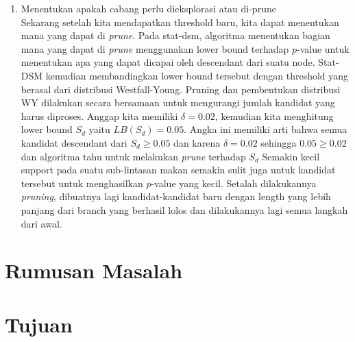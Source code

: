 \documentclass[a4paper,twoside]{article}
\begin{document}
\begin{enumerate}
	Sekarang dapat dengan $\alpha = 0.05$ dan $B = 252$ dapat dihitung sebagai \[ \alpha B = \lfloor 0.05(252) \rfloor = \lfloor 12.6 \rfloor = 12 \]
	Sehingga dari tabel list $p_{min}^x$ kami mengambil nilai ke-12 yaitu $\delta = 0.04762$ dan inilah yang akan menjadi threshold baru.
	Kita kemudian akan melihat lagi nilai-nilai $p$-value yang menggunakan data label original dan filter lagi menggunakan threshold yang baru.
	\item Menentukan apakah cabang perlu dieksplorasi atau di-prune \\
	Sekarang setelah kita mendapatkan threshold baru, kita dapat menentukan mana yang dapat di \textit{prune}.
	Pada stat-dsm, algoritma menentukan bagian mana yang dapat di \textit{prune} menggunakan lower bound terhadap $p$-value untuk menentukan apa yang dapat dicapai oleh descendant dari suatu node.
	Stat-DSM kemudian membandingkan lower bound tersebut dengan threshold yang berasal dari distribusi Westfall-Young.
	Pruning dan pembentukan distribusi WY dilakukan secara bersamaan untuk mengurangi jumlah kandidat yang harus diproses.
	Anggap kita memiliki $\delta = 0.02$, kemudian kita menghitung lower bound $S_d$ yaitu $LB(S_d) = 0.05$.
	Angka ini memiliki arti bahwa semua kandidat descendant dari $S_d \geq 0.05$ dan karena $\delta = 0.02$ sehingga $0.05 \geq 0.02$ dan algoritma tahu untuk melakukan \textit{prune} terhadap $S_d$
	Semakin kecil support pada suatu sub-lintasan makan semakin sulit juga untuk kandidat tersebut untuk menghasilkan $p$-value yang kecil.
	Setalah dilakukannya \textit{pruning}, dibuatnya lagi kandidat-kandidat baru dengan length yang lebih panjang dari branch yang berhasil lolos dan dilakukannya lagi semua langkah dari awal.
\end{enumerate}



\section{Rumusan Masalah}

\section{Tujuan}
\end{document}
